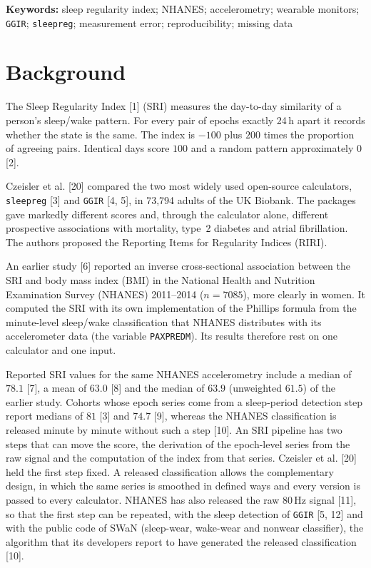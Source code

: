 \documentclass[12pt]{article}
\begin{document}
\vspace{0.6em}
\noindent\textbf{Keywords:} sleep regularity index; NHANES; accelerometry; wearable monitors; \texttt{GGIR};
\texttt{sleepreg}; measurement error; reproducibility; missing data

\clearpage

\section{Background}

The Sleep Regularity Index [1] (SRI) measures the
day-to-day similarity of a person's sleep/wake pattern. For every pair of
epochs exactly 24\,h apart it records whether the state is the same. The index is $-100$ plus $200$ times the proportion of agreeing pairs. Identical
days score $100$ and a random pattern approximately $0$ [2].

Czeisler et al. [20] compared the two most widely used open-source
calculators, \texttt{sleepreg} [3] and \texttt{GGIR}
[4, 5], in 73{,}794 adults of the UK
Biobank. The packages gave markedly different scores and, through the calculator
alone, different prospective associations with mortality, type~2 diabetes and atrial fibrillation. The authors proposed the Reporting Items for Regularity
Indices (RIRI).

An earlier study [6] reported an inverse
cross-sectional association between the SRI and body mass index (BMI) in the National Health and Nutrition Examination Survey (NHANES) 2011--2014 ($n=7085$), more clearly in women. It computed the SRI with its own
implementation of the Phillips formula from the minute-level sleep/wake
classification that NHANES distributes with its accelerometer data (the
variable \texttt{PAXPREDM}). Its results therefore rest on one calculator and one input.

Reported SRI values for the same NHANES accelerometry include a median of $78.1$ [7], a mean of $63.0$ [8] and the median of $63.9$ (unweighted $61.5$) of the earlier study. Cohorts whose epoch series come from a
sleep-period detection step report medians of $81$ [3] and
$74.7$ [9], whereas the NHANES classification is
released minute by minute without such a step [10]. An SRI pipeline has two steps that
can move the score, the derivation of the epoch-level series from the raw
signal and the computation of the index from that series. Czeisler et al. [20] held the first step fixed. A released classification allows the
complementary design, in which the same series is smoothed in defined ways and
every version is passed to every calculator. NHANES has also
released the raw 80\,Hz signal [11],
so that the first step can be repeated, with the sleep detection of
\texttt{GGIR} [5, 12] and with the public code of SWaN (sleep-wear, wake-wear and nonwear classifier), the algorithm that its developers report to have generated the released
classification [10].
\end{document}
